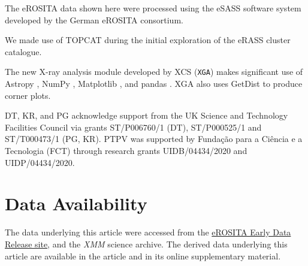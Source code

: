 \documentclass[fleqn,usenatbib]{mnras}
\begin{document}
The eROSITA data shown here were processed using the eSASS software system developed by the German eROSITA consortium.

We made use of TOPCAT \citep[][]{topcat} during the initial exploration of the eRASS cluster catalogue.

The new X-ray analysis module developed by XCS (\texttt{XGA}) makes significant use of Astropy \citep[][]{astropy1, astropy2}, NumPy \citep[][]{numpy}, Matplotlib \citep[][]{matplotlib}, and pandas \citep[][]{pandassoftware,pandaspaper}. XGA also uses GetDist \citep[][]{getdist} to produce corner plots.

DT, KR, and PG acknowledge support from the UK Science and Technology Facilities Council via grants ST/P006760/1 (DT),  ST/P000525/1 and ST/T000473/1 (PG, KR). PTPV was supported by Fundação para a Ciência e a Tecnologia (FCT) through research grants UIDB/04434/2020 and UIDP/04434/2020.
\section*{Data Availability}

The data underlying this article were accessed from the \href{https://erosita.mpe.mpg.de/edr/eROSITAObservations/Catalogues/}{eROSITA Early Data Release site}, and the {\em XMM} science archive. The derived data underlying this article are available in the article and in its online supplementary material.








\end{document}
